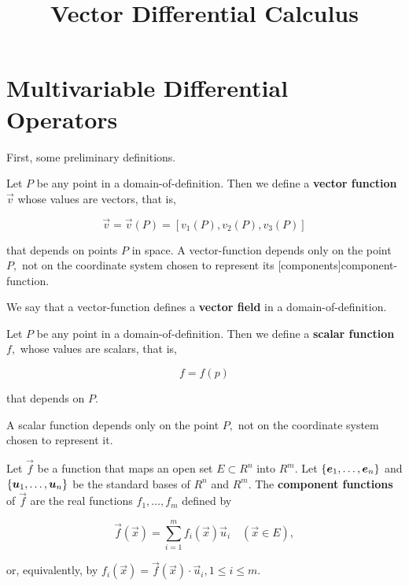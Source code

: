 \documentclass{article}
\title{Vector Differential Calculus}
\begin{document}
\section{Multivariable Differential Operators}

First, some preliminary definitions.

\begin{definition}
Let $P$ be any \@{point} in a \@{domain-of-definition}. Then we define a \textbf{vector function} $\vec{v}$ whose \@{values} are \@{vectors}, that is,

\[ \vec{v} = \vec{v}(P) = [v_1(P), v_2(P), v_3(P)] \]

that depends on points $P$ in space. A \@{vector-function} depends only on the point $P,$ not on the coordinate system chosen to represent its \@[components]{component-function}.
\end{definition}

\begin{definition}
We say that a \@{vector-function} defines a \textbf{vector field} in a \@{domain-of-definition}.
\end{definition}

\begin{definition}
Let $P$ be any \@{point} in a \@{domain-of-definition}. Then we define a \textbf{scalar function} $f,$ whose \@{values} are \@{scalars}, that is,

\[ f = f(p) \]

that depends on $P.$

A scalar function depends only on the point $P,$ not on the coordinate system chosen to represent it.
\end{definition}

\begin{definition}
Let $\vec{f}$ be a \@{function} that maps an \@{open} \@{set} $E \subset R^n$ into $R^m.$ Let $\left\{ \boldsymbol{e}_1, \dots, \boldsymbol{e}_n \right\}$ and $\left\{ \boldsymbol{u}_1, \dots, \boldsymbol{u}_n \right\}$ be the standard bases of $R^n$ and $R^m.$ The \textbf{component functions} of $\vec{f}$ are the real \@{functions} $f_1, \dots, f_m$ defined by

\[ \vec{f}(\vec{x}) = \sum_{i=1}^m f_i(\vec{x})\vec{u}_i \quad (\vec{x} \in E), \]

or, equivalently, by $f_i(\vec{x}) = \vec{f}(\vec{x}) \cdot \vec{u}_i, 1 \leq i \leq m. $
\end{definition}
\end{document}
